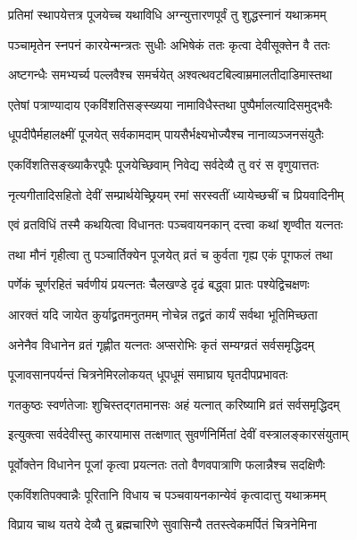 \twolineshloka
{प्रतिमां स्थापयेत्तत्र पूजयेच्च यथाविधि}
{अग्न्युत्तारणपूर्वं तु शुद्धस्नानं यथाक्रमम्}%


\twolineshloka
{पञ्चामृतेन स्नपनं कारयेन्मन्त्रतः सुधीः}
{अभिषेकं ततः कृत्वा देवीसूक्तेन वै ततः}%


\twolineshloka
{अष्टगन्धैः समभ्यर्च्य पल्लवैश्च समर्चयेत्}
{अश्वत्थवटबिल्वाम्रमालतीदाडिमास्तथा}%


\twolineshloka
{एतेषां पत्राण्यादाय एकविंशतिसङ्स्ख्यया}
{नामाविधैस्तथा पुष्पैर्मालत्यादिसमुद्भवैः}%


\twolineshloka
{धूपदीपैर्महालक्ष्मीं पूजयेत् सर्वकामदाम्}
{पायसैर्भक्ष्यभोज्यैश्च नानाव्यञ्जनसंयुतैः}%


\twolineshloka
{एकविंशतिसङ्ख्याकैरपूपैः पूजयेच्छिवाम्}
{निवेद्य सर्वदेव्यै तु वरं स वृणुयात्ततः}%


\twolineshloka
{नृत्यगीतादिसहितो देवीं सम्प्रार्थयेच्छ्रियम्}
{रमां सरस्वतीं ध्यायेच्छचीं च प्रियवादिनीम्}%


\twolineshloka
{एवं व्रतविधिं तस्मै कथयित्वा विधानतः}
{पञ्चवायनकान् दत्त्वा कथां शृण्वीत यत्नतः}%


\twolineshloka
{तथा मौनं गृहीत्वा तु पञ्चार्तिक्येन पूजयेत्}
{व्रतं च कुर्वता गृह्य एकं पूगफलं तथा}%


\twolineshloka
{पर्णेकं चूर्णरहितं चर्वणीयं प्रयत्नतः}
{चैलखण्डे दृढं बद्ध्वा प्रातः पश्येद्विचक्षणः}%


\twolineshloka
{आरक्तं यदि जायेत कुर्याद्व्रतमनुतमम्}
{नोचेन्न तद्व्रतं कार्यं सर्वथा भूतिमिच्छता}%


\twolineshloka
{अनेनैव विधानेन व्रतं गृह्णीत यत्नतः}
{अप्सरोभिः कृतं सम्यग्व्रतं सर्वसमृद्धिदम्}%


\twolineshloka
{पूजावसानपर्यन्तं चित्रनेमिरलोकयत्}
{धूपधूमं समाघ्राय घृतदीपप्रभावतः}%


\twolineshloka
{गतकुष्ठः स्वर्णतेजाः शुचिस्तद्गतमानसः}
{अहं यत्नात् करिष्यामि व्रतं सर्वसमृद्धिदम्}%


\twolineshloka
{इत्युक्त्वा सर्वदेवीस्तु कारयामास तत्क्षणात्}
{सुवर्णनिर्मितां देवीं वस्त्रालङ्कारसंयुताम्}%


\twolineshloka
{पूर्वोक्तेन विधानेन पूजां कृत्वा प्रयत्नतः}
{ततो वैणवपात्राणि फलान्नैश्च सदक्षिणैः}%


\twolineshloka
{एकविंशतिपक्वान्नैः पूरितानि विधाय च}
{पञ्चवायनकान्येवं कृत्वादात्तु यथाक्रमम्}%


\twolineshloka
{विप्राय चाथ यतये देव्यै तु ब्रह्मचारिणे}
{सुवासिन्यै ततस्त्वेकमर्पितं चित्रनेमिना}%


